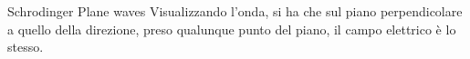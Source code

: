 Schrodinger
Plane waves
    Visualizzando l'onda, si ha che sul piano perpendicolare a quello della
    direzione, preso qualunque punto del piano, il campo elettrico è lo stesso.

